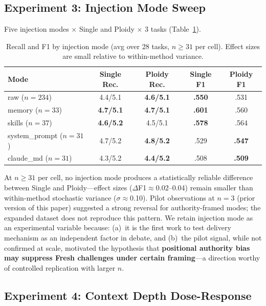\documentclass{article}
\begin{document}
\subsection{Experiment 3: Injection Mode Sweep}
\label{sec:injection-sweep}

Five injection modes $\times$ Single and Ploidy $\times$ 3 tasks (Table~\ref{tab:injection}).

\begin{table}[t]
\centering
\caption{Recall and F1 by injection mode (avg over 28 tasks, $n{\geq}31$ per cell). Effect sizes are small relative to within-method variance.}
\label{tab:injection}
\footnotesize
\begin{tabular}{@{}lcccc@{}}
\toprule
\textbf{Mode} & \textbf{Single Rec.} & \textbf{Ploidy Rec.} & \textbf{Single F1} & \textbf{Ploidy F1} \\
\midrule
raw ($n{=}234$) & 4.4/5.1 & \textbf{4.6/5.1} & \textbf{.550} & .531 \\
memory ($n{=}33$) & \textbf{4.7/5.1} & \textbf{4.7/5.1} & \textbf{.601} & .560 \\
skills ($n{=}37$) & \textbf{4.6/5.2} & 4.5/5.1 & \textbf{.578} & .564 \\
system\_prompt ($n{=}31$) & 4.7/5.2 & \textbf{4.8/5.2} & .529 & \textbf{.547} \\
claude\_md ($n{=}31$) & 4.3/5.2 & \textbf{4.4/5.2} & .508 & \textbf{.509} \\
\bottomrule
\end{tabular}
\end{table}

At $n{\geq}31$ per cell, no injection mode produces a statistically reliable difference between Single and Ploidy---effect sizes ($\Delta$F1${\approx}$0.02--0.04) remain smaller than within-method stochastic variance ($\sigma{\approx}$0.10). Pilot observations at $n{=}3$ (prior version of this paper) suggested a strong reversal for authority-framed modes; the expanded dataset does not reproduce this pattern. We retain injection mode as an experimental variable because: (a)~it is the first work to test delivery mechanism as an independent factor in debate, and (b)~the pilot signal, while not confirmed at scale, motivated the hypothesis that \textbf{positional authority bias may suppress Fresh challenges under certain framing}---a direction worthy of controlled replication with larger $n$.

\subsection{Experiment 4: Context Depth Dose-Response}
\end{document}
